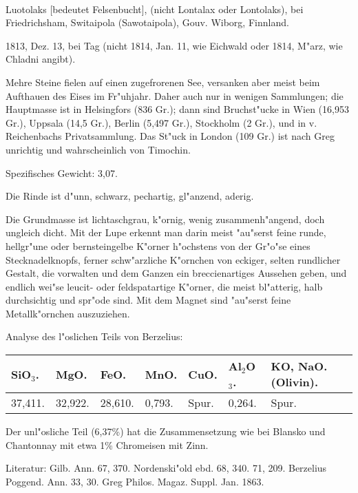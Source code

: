 \documentclass[a4paper, 11pt, oneside]{article}
\begin{document}
\paragraph{}
Luotolaks [bedeutet Felsenbucht], (nicht Lontalax oder Lontolaks), bei Friedrichsham, Switaipola (Sawotaipola), Gouv. Wiborg, Finnland.

1813, Dez. 13, bei Tag (nicht 1814, Jan. 11, wie Eichwald oder 1814, M"arz, wie Chladni angibt).

Mehre Steine fielen auf einen zugefrorenen See, versanken aber meist beim Aufthauen des Eises im Fr"uhjahr. Daher auch nur in wenigen Sammlungen; die Hauptmasse ist in Helsingfors (836 Gr.); dann sind Bruchst"ucke in Wien (16,953 Gr.), Uppsala (14,5 Gr.), Berlin (5,497 Gr.), Stockholm (2 Gr.), und in v. Reichenbachs Privatsammlung. Das St"uck in London (109 Gr.) ist nach Greg unrichtig und wahrscheinlich von Timochin.

Spezifisches Gewicht: 3,07.

Die Rinde ist d"unn, schwarz, pechartig, gl"anzend, aderig.

Die Grundmasse ist lichtaschgrau, k"ornig, wenig zusammenh"angend, doch ungleich dicht. Mit der Lupe erkennt man darin meist "au"serst feine runde, hellgr"une oder bernsteingelbe K"orner h"ochstens von der Gr"o"se eines Stecknadelknopfs, ferner schw"arzliche K"ornchen von eckiger, selten rundlicher Gestalt, die vorwalten und dem Ganzen ein breccienartiges Aussehen geben, und endlich wei"se leucit- oder feldspatartige K"orner, die meist bl"atterig, halb durchsichtig und spr"ode sind. Mit dem Magnet sind "au"serst feine Metallk"ornchen auszuziehen.

Analyse des l"oslichen Teils von Berzelius:
\begin{table}[!ht]
    \centering
    \begin{tabular}{l l l l l l l}
        SiO$_{3}$. & MgO. & FeO. & MnO. & CuO. & Al$_{2}$O$_{3}$. & KO, NaO. (Olivin). \\ \hline
        37,411. & 32,922. & 28,610. & 0,793. & Spur. & 0,264. & Spur. \\
    \end{tabular}
\end{table}

Der unl"osliche Teil (6,37\%) hat die Zusammensetzung wie bei Blansko und Chantonnay mit etwa 1\% Chromeisen mit Zinn.

\footnotesize
Literatur: Gilb. Ann. 67, 370. Nordenski"old ebd. 68, 340. 71, 209. Berzelius Poggend. Ann. 33, 30. Greg Philos. Magaz. Suppl. Jan. 1863.
\end{document}
